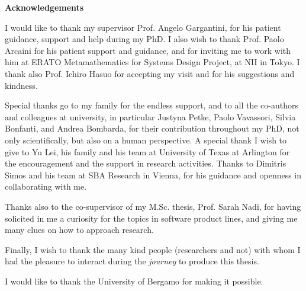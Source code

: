 \newenvironment{acknowledgements}%
{\clearpage\thispagestyle{empty}\null\vfill\begin{center}%
		\bfseries Acknowledgements\end{center}}%
{\vfill\null}
\begin{acknowledgements}
	I would like to thank my supervisor Prof. Angelo Gargantini, for his patient guidance, support and help during my PhD. 
	I also wish to thank Prof. Paolo Arcaini for his patient support and guidance, and for inviting me to work with him at ERATO Metamathematics for Systems Design Project, at NII in Tokyo. I thank also Prof. Ichiro Hasuo for accepting my visit and for his suggestions and kindness.

	Special thanks go to my family for the endless support, and to all the co-authors and colleagues at university, in particular Justyna Petke, Paolo Vavassori, Silvia Bonfanti, and Andrea Bombarda, for their contribution throughout my PhD, not only scientifically, but also on a human perspective.
	A special thank I wish to give to Yu Lei, his family and his team at University of Texas at Arlington for the encouragement and the support in research activities.
	Thanks to Dimitris Simos and his team at SBA Research in Vienna, for his guidance and openness in collaborating with me.
	
	Thanks also to the co-supervisor of my M.Sc. thesis, Prof. Sarah Nadi, for having solicited in me a curiosity for the topics in software product lines, and giving me many clues on how to approach research.
	
	Finally, I wish to thank the many kind people (researchers and not) with whom I had the pleasure to interact during the \textit{journey} to produce this thesis.
	
	I would like to thank the University of Bergamo for making it possible.
\end{acknowledgements}

\clearpage

\tableofcontents %

\clearpage

\listoffigures %

\clearpage

\listoftables %

